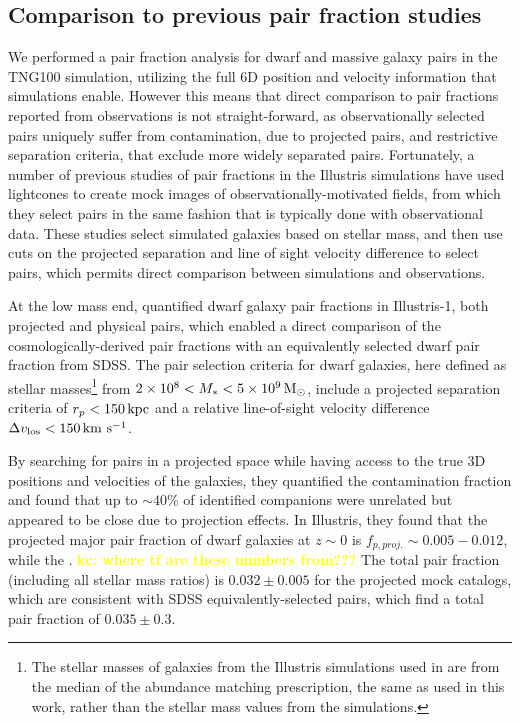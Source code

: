 \documentclass[twocolumn]{aastex631}
\newcommand{\kc}[1]{\textcolor{yellow}{\textbf{kc: #1}} }
\begin{document}
\subsection{Comparison to previous pair fraction studies}
We performed a pair fraction analysis for dwarf and massive galaxy pairs in the TNG100 simulation, utilizing the full 6D position and velocity information that simulations enable. 
However this means that direct comparison to pair fractions reported from observations is not straight-forward, as observationally selected pairs uniquely suffer from contamination, due to projected pairs, and restrictive separation criteria, that exclude more widely separated pairs. 
Fortunately, a number of previous studies of pair fractions in the Illustris simulations have used lightcones to create mock images of observationally-motivated fields, from which they select pairs in the same fashion that is typically done with observational data.
These studies select simulated galaxies based on stellar mass, and then use cuts on the projected separation and line of sight velocity difference to select pairs, which permits direct comparison between simulations and observations. 

At the low mass end, \citet{Besla2018} quantified dwarf galaxy pair fractions in Illustris-1, both projected and physical pairs, which enabled a direct comparison of the cosmologically-derived pair fractions with an equivalently selected dwarf pair fraction from SDSS.  
The pair selection criteria for dwarf galaxies, here defined as stellar masses\footnote{The stellar masses of galaxies from the Illustris simulations used in \citet{Besla2018} are from the median of the \citet{Moster2013} abundance matching prescription, the same as used in this work, rather than the stellar mass values from the simulations.} from $2\times10^{8} < M_{*} < 5\times10^{9}\,\mathrm{M}_\odot$, include a projected separation criteria of $r_{p} < 150\,\mathrm{kpc}$ and a relative line-of-sight velocity difference $\Delta v_{\rm los} < 150\,\mathrm{km}~\mathrm{s}^{-1}$. 

By searching for pairs in a projected space while having access to the true 3D positions and velocities of the galaxies, they quantified the contamination fraction and found that up to $\sim40$\% of identified companions were unrelated but appeared to be close due to projection effects. 
In Illustris, they found that the projected major pair fraction of dwarf galaxies at $z\sim0$ is $f_{p,proj.}\sim0.005-0.012$, while the . \kc{where tf are these numbers from??? }
The total pair fraction (including all stellar mass ratios) is $0.032\pm0.005$ for the projected mock catalogs, which are consistent with SDSS equivalently-selected pairs, which find a total pair fraction of $0.035\pm0.3$. 
\end{document}
